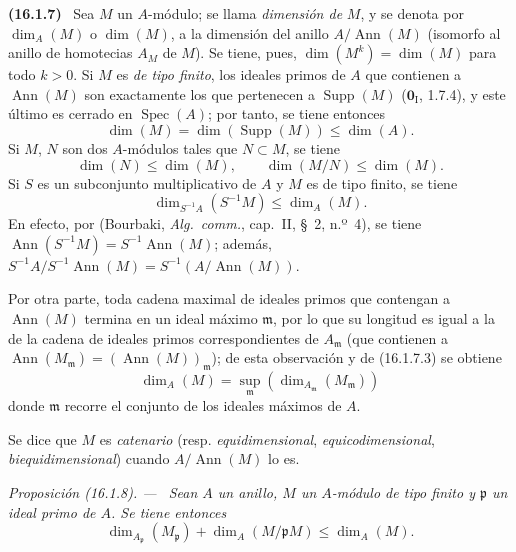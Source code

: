 \documentclass[10pt,oneside]{book}
\makeatletter
\newcommand{\setmanualcurrentlabel}[1]{\def\@currentlabel{#1}}
\newcommand{\oldpage}[2][]{%
  \setcounter{footnote}{0}%
  \marginpar{\scriptsize\textbf{#1}~|~#2}\ignorespaces}
\newenvironment{env}[1][]{\setmanualcurrentlabel{#1}\par\medskip\noindent\textbf{(#1)}\ }{\par}
\newenvironment{proposition}[1][]{%
  \setmanualcurrentlabel{#1}\par\medskip\noindent\itshape Proposición (#1). ---\ }{\par}
\makeatother
\begin{document}
\begin{env}[16.1.7]
\label{0.16.1.7-es}
Sea $M$ un $A$-módulo; se llama \emph{dimensión de} $M$, y se denota por
$\dim_A(M)$ o $\dim(M)$, a la dimensión del anillo $A/\operatorname{Ann}(M)$
(isomorfo al anillo de homotecias $A_M$ de $M$). Se tiene, pues,
$\dim(M^k)=\dim(M)$ para todo $k>0$. Si $M$ es \emph{de tipo finito}, los ideales
primos de $A$ que contienen a $\operatorname{Ann}(M)$ son exactamente los que
pertenecen a $\operatorname{Supp}(M)$ ($\mathbf{0}_{\mathrm I}$, 1.7.4), y este último
es cerrado en $\operatorname{Spec}(A)$; por tanto, se tiene entonces
\[
\label{0.16.1.7.1-es}
  \dim(M)=\dim(\operatorname{Supp}(M))\leq\dim(A).
\tag{16.1.7.1}
\]
Si $M$, $N$ son dos $A$-módulos tales que $N\subset M$, se tiene
\[
\label{0.16.1.7.2-es}
  \dim(N)\leq\dim(M),\qquad \dim(M/N)\leq\dim(M).
\tag{16.1.7.2}
\]
Si $S$ es un subconjunto multiplicativo de $A$ y $M$ es de tipo finito, se
tiene
\[
\label{0.16.1.7.3-es}
  \dim_{S^{-1}A}(S^{-1}M)\leq\dim_A(M).
\tag{16.1.7.3}
\]
En efecto, por (Bourbaki, \emph{Alg.~comm.}, cap.~II, \S~2, n.º~4), se tiene
$\operatorname{Ann}(S^{-1}M)=S^{-1}\operatorname{Ann}(M)$; además,
$S^{-1}A/S^{-1}\operatorname{Ann}(M)=S^{-1}(A/\operatorname{Ann}(M))$.

Por otra parte, toda cadena maximal de ideales primos que contengan a
$\operatorname{Ann}(M)$ termina en un ideal máximo $\mathfrak{m}$, por lo que
su longitud es igual a la de la cadena de ideales primos correspondientes de
$A_{\mathfrak{m}}$ (que contienen a
$\operatorname{Ann}(M_{\mathfrak{m}})=(\operatorname{Ann}(M))_{\mathfrak{m}}$);
de esta observación y de (16.1.7.3) se obtiene
\[
\label{0.16.1.7.4-es}
  \dim_A(M)=\sup_{\mathfrak{m}}
  (\dim_{A_{\mathfrak{m}}}(M_{\mathfrak{m}}))
\tag{16.1.7.4}
\]
donde $\mathfrak{m}$ recorre el conjunto de los ideales máximos de $A$.

Se dice que $M$ es \emph{catenario} (resp. \emph{equidimensional}, \emph{equicodimensional},
\emph{biequidimensional}) cuando $A/\operatorname{Ann}(M)$ lo es.
\end{env}

\begin{proposition}[16.1.8]
\label{0.16.1.8-es}
\oldpage[0\textsubscript{IV-1}]{25}
Sean $A$ un anillo, $M$ un $A$-módulo de tipo finito y $\mathfrak{p}$ un ideal
primo de $A$. Se tiene entonces
\[
\label{0.16.1.8.1-es}
  \dim_{A_{\mathfrak{p}}}(M_{\mathfrak{p}})
  +\dim_A(M/\mathfrak{p}M)\leq\dim_A(M).
\tag{16.1.8.1}
\]
\end{proposition}
\end{document}
